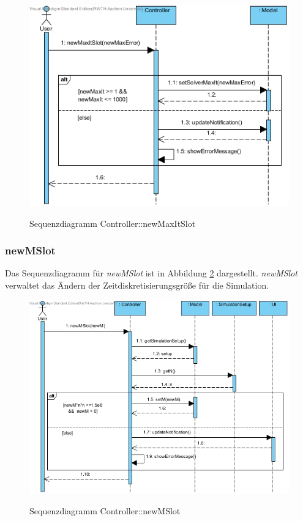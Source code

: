 \begin{figure}[H]
	\centering
	\includegraphics[scale=.75]{Bilder/Controller__newMaxItSlot().jpg}\\
	\caption{Sequenzdiagramm Controller::newMaxItSlot}
	\label{Sequenzdiagramm Controller::newMaxItSlot}
\end{figure}

\subsubsection*{newMSlot}

Das Sequenzdiagramm für \emph{newMSlot} ist in Abbildung \ref{Sequenzdiagramm Controller::newMSlot} dargestellt. \emph{newMSlot} verwaltet das Ändern der Zeitdiskretisierungsgröße für die Simulation.

\begin{figure}[H]
	\centering
	\includegraphics[scale=.7]{Bilder/Controller__newMSlot().jpg}\\
	\caption{Sequenzdiagramm Controller::newMSlot}
	\label{Sequenzdiagramm Controller::newMSlot}
\end{figure}

